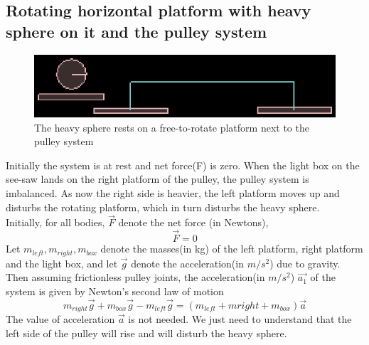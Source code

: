 \documentclass[11pt,english]{article}
\begin{document}
\subsection{Rotating horizontal platform with heavy sphere on it and the pulley system}
\begin{figure}[h!]
\centering
\includegraphics[scale=1]{rotatingplatform}
\caption{The heavy sphere rests on a free-to-rotate platform next to the pulley system}
\end{figure}
\indent \par{Initially the system is at rest and net force(F) is zero\cite{wikilaw2}. When the light box on the see-saw lands on the right platform of the pulley, the pulley system is imbalanced. As now the right side is heavier, the left platform moves up and disturbs the rotating platform, which in turn disturbs the heavy sphere.}
\\
\indent Initially, for all bodies, $\vec{F}$ denote the net force (in Newtons),
\begin{equation}
\vec{F}= 0
\end{equation}
\indent Let $m_{left}, m_{right}, m_{box}$ denote the masses(in kg) of the left platform, right platform and the light box, and let $\vec{g}$ denote the acceleration(in $m/s^2$) due to gravity. Then assuming frictionless pulley joints, the acceleration(in $m/s^2$) $\vec{a_1}$ of the system is given by Newton's second law of motion\cite{wikilaw2}
\begin{equation}
m_{right}\vec{g} + m_{box} \vec{g}- m_{left} \vec{g} = (m_{left}+m{right}+m_{box})\vec{a}
\end{equation}
\indent The value of acceleration $\vec{a}$ is not needed. We just need to understand that the left side of the pulley will rise and will disturb the heavy sphere.
\end{document}
